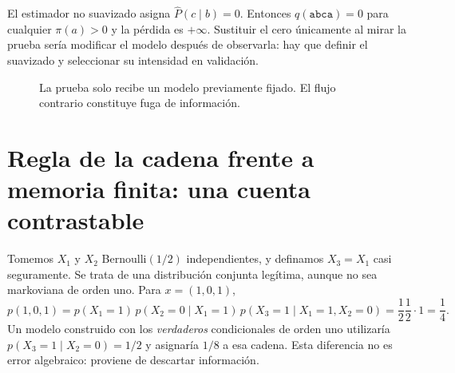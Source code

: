 \begin{ejemplo}
El estimador no suavizado asigna $\widehat P(c\mid b)=0$.
Entonces $q(\texttt{abca})=0$ para cualquier $\pi(a)>0$ y la pérdida
es $+\infty$. Sustituir el cero únicamente al mirar la prueba sería
modificar el modelo después de observarla: hay que definir el suavizado y
seleccionar su intensidad en validación.
\end{ejemplo}

\begin{figure}[H]\centering
{}
\caption{La prueba solo recibe un modelo previamente fijado. El flujo contrario constituye fuga de información.}
\end{figure}

\section*{Regla de la cadena frente a memoria finita: una cuenta contrastable}
Tomemos $X_1$ y $X_2$ Bernoulli$(1/2)$ independientes, y definamos
$X_3=X_1$ casi seguramente. Se trata de una distribución conjunta legítima,
aunque no sea markoviana de orden uno. Para $x=(1,0,1)$,
\[
 p(1,0,1)=p(X_1=1)\,p(X_2=0\mid X_1=1)\,
 p(X_3=1\mid X_1=1,X_2=0)=\frac12\frac12\cdot1=\frac14.
\]
Un modelo construido con los \emph{verdaderos} condicionales de orden uno
utilizaría $p(X_3=1\mid X_2=0)=1/2$ y asignaría $1/8$ a esa cadena.
Esta diferencia no es error algebraico: proviene de descartar información.


